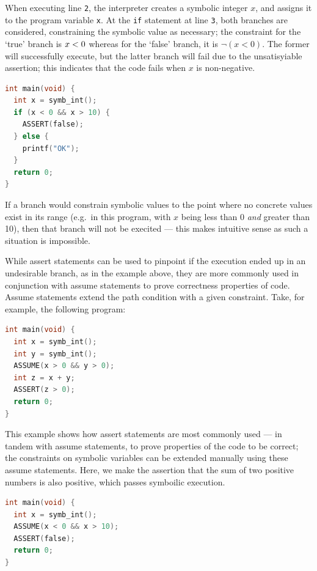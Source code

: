 When executing line \texttt{2}, the interpreter creates a symbolic integer $x$,
and assigns it to the program variable \texttt{x}. At the \texttt{if} statement
at line \texttt{3}, both branches are considered, constraining the symbolic
value as necessary; the constraint for the `true' branch is \texttt{$x < 0$}
whereas for the `false' branch, it is \texttt{$\lnot (x < 0)$}. The former will
successfully execute, but the latter branch will fail due to the unsatisyiable
assertion; this indicates that the code fails when $x$ is non-negative.

\begin{lstlisting}[caption={Symbolic execution - non-executed branches}, style=code, language=C]
int main(void) {
  int x = symb_int();
  if (x < 0 && x > 10) {
    ASSERT(false);
  } else {
    printf("OK");
  }
  return 0;
}
\end{lstlisting}

If a branch would constrain symbolic values to the point where no concrete
values exist in its range (e.g.\ in this program, with $x$ being less than 0
\textit{and} greater than 10), then that branch will not be execited --- this
makes intuitive sense as such a situation is impossible.

While assert statements can be used to pinpoint if the execution ended up in an
undesirable branch, as in the example above, they are more commonly used in
conjunction with assume statements to prove correctness properties of code.
Assume statements extend the path condition with a given constraint. Take, for
example, the following program:

\begin{lstlisting}[caption={Symbolic execution - assume and assert}, style=code, language=C]
int main(void) {
  int x = symb_int();
  int y = symb_int();
  ASSUME(x > 0 && y > 0);
  int z = x + y;
  ASSERT(z > 0);
  return 0;
}
\end{lstlisting}

This example shows how assert statements are most commonly used --- in tandem
with assume statements, to prove properties of the code to be correct; the
constraints on symbolic variables can be extended manually using these assume
statements. Here, we make the assertion that the sum of two positive numbers is
also positive, which passes symboilic execution.

\begin{lstlisting}[caption={Symbolic execution - termination when unsatisfiable}, style=code, language=C]
int main(void) {
  int x = symb_int();
  ASSUME(x < 0 && x > 10);
  ASSERT(false);
  return 0;
}
\end{lstlisting}

